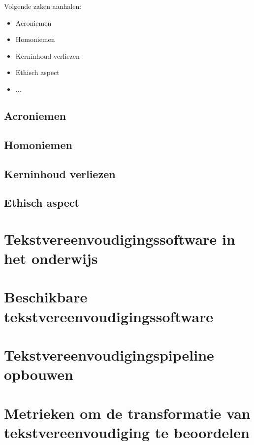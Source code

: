 Volgende zaken aanhalen:
\begin{itemize}
	\item Acroniemen
	\item Homoniemen
	\item Kerninhoud verliezen
	\item Ethisch aspect
	\item ...
\end{itemize}

\subsection{Acroniemen}

\subsection{Homoniemen}

\subsection{Kerninhoud verliezen}

\subsection{Ethisch aspect}

\cite{Gooding2022}

\section{Tekstvereenvoudigingssoftware in het onderwijs}

\section{Beschikbare tekstvereenvoudigingssoftware}

\section{Tekstvereenvoudigingspipeline opbouwen}

\section{Metrieken om de transformatie van tekstvereenvoudiging te beoordelen}



